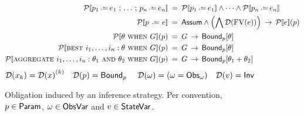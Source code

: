 \begin{figure}
  \EquationsFigureSize
  \begin{align*}
    \ProofSem{p_1 \dlassign e_1 \seq \dots \seq p_n \dlassign e_n} &\DefEq \ProofSem{p_1 \dlassign e_1} \wedge \dots \wedge \ProofSem{p_n \dlassign e_n} \\
    \ProofSem{p \slassign e} &\DefEq \Assum \wedge \Bigl(\bigwedge \VarDef{\FV(e)}\Bigr) \limply \ProofSem{e}(p) \\
    \ProofSem{\theta \slwhen G}(p) &\DefEq G \limply \BoundWith{p}{\theta} \\
    \ProofSem{\slbest i_1, \dots, i_n : \theta  \slwhen G}(p) &\DefEq G \limply \BoundWith{p}{\theta} \\
    \ProofSem{\slaggregate i_1, \dots, i_n: \theta_1 \sland \theta_2  \slwhen G}(p) &\DefEq G \limply \BoundWith{p}{\theta_1 + \theta_2}
  \end{align*}
  \begin{equation*}
    \mathcal{D}(x_k) = {\mathcal{D}(x)}^{(k)} \quad
    \mathcal{D}(p) = \mathsf{Bound}_p\  \quad
    \mathcal{D}(\omega) = (\omega = \mathsf{Obs}_\omega) \quad
    \mathcal{D}(v) = \mathsf{Inv}
  \end{equation*}
  \caption{Obligation induced by an inference strategy. Per convention, $p \in \mathsf{Param}$, $\omega \in \mathsf{ObsVar}$ and $v \in \mathsf{StateVar}$.}\label{fig:inf-lang-obligations}
  \Description[]{}
\end{figure}
